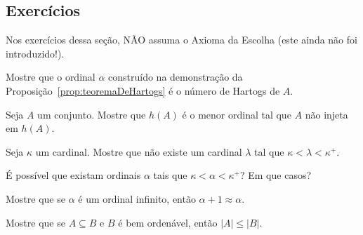 \subsection*{Exercícios}
Nos exercícios dessa seção, NÃO assuma o Axioma da Escolha (este ainda não foi introduzido!).
\begin{exercise}
    Mostre que o ordinal $\alpha$ construído na demonstração da Proposição~\ref{prop:teoremaDeHartogs} é o número de Hartogs de $A$.
\end{exercise}
\begin{exercise}
    Seja $A$ um conjunto.
    Mostre que $h(A)$ é o menor ordinal tal que $A$ não injeta em $h(A)$.
\end{exercise}
\begin{exercise}
    Seja $\kappa$ um cardinal.
    Mostre que não existe um cardinal $\lambda$ tal que $\kappa<\lambda<\kappa^+$.

    É possível que existam ordinais $\alpha$ tais que $\kappa<\alpha<\kappa^+$?
    Em que casos?
\end{exercise}
\begin{exercise}
Mostre que se $\alpha$ é um ordinal infinito, então $\alpha+1\approx \alpha$.
\end{exercise}
\begin{exercise}
    Mostre que se $A\subseteq B$ e $B$ é bem ordenável, então $|A|\leq |B|$.
\end{exercise}
